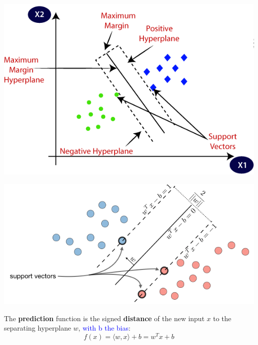 \documentclass[letterpaper, 10.5pt,landscape]{article}
\begin{document}
\begin{multicols*}{3}
\vspace{-10pt}
\begin{center}
    \begin{minipage}{0.65\linewidth}
    \includegraphics[width=\textwidth]{figures/svm_figure.PNG}
    \end{minipage}
\end{center}

\vspace{-10pt}

\begin{center}
    \begin{minipage}{0.8\linewidth}
    \includegraphics[width=\textwidth]{figures/svm_figures2.PNG}
    \end{minipage}
\end{center}
\vspace{-5pt}

The \textbf{prediction} function is the signed \textbf{distance} of the new input $x$ to the separating hyperplane $w$, \textcolor{blue}{with b the bias}: 
\vspace{-4pt}
\[\boxed{f(x) = \langle w,x\rangle + b = w^{T} x + b} \] 
\vspace{-5pt}





\end{multicols*}
\end{document}
